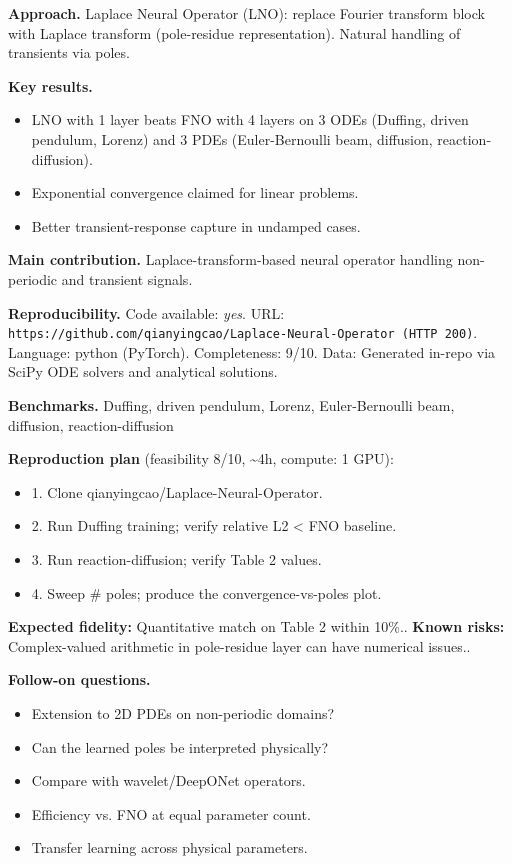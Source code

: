 \documentclass[10pt,letterpaper]{article}
\begin{document}
\textbf{Approach.} Laplace Neural Operator (LNO): replace Fourier transform block with Laplace transform (pole-residue representation). Natural handling of transients via poles.

\textbf{Key results.}
\begin{itemize}
\item LNO with 1 layer beats FNO with 4 layers on 3 ODEs (Duffing, driven pendulum, Lorenz) and 3 PDEs (Euler-Bernoulli beam, diffusion, reaction-diffusion).
\item Exponential convergence claimed for linear problems.
\item Better transient-response capture in undamped cases.
\end{itemize}

\textbf{Main contribution.} Laplace-transform-based neural operator handling non-periodic and transient signals.

\textbf{Reproducibility.} Code available: \emph{yes}. URL: \texttt{https://github.com/qianyingcao/Laplace-Neural-Operator (HTTP 200)}. Language: python (PyTorch). Completeness: 9/10. Data: Generated in-repo via SciPy ODE solvers and analytical solutions.

\textbf{Benchmarks.} Duffing, driven pendulum, Lorenz, Euler-Bernoulli beam, diffusion, reaction-diffusion

\textbf{Reproduction plan} (feasibility 8/10, \textasciitilde4h, compute: 1 GPU):
\begin{itemize}
\item 1. Clone qianyingcao/Laplace-Neural-Operator.
\item 2. Run Duffing training; verify relative L2 < FNO baseline.
\item 3. Run reaction-diffusion; verify Table 2 values.
\item 4. Sweep \# poles; produce the convergence-vs-poles plot.
\end{itemize}
\textbf{Expected fidelity:} Quantitative match on Table 2 within 10\%.. \textbf{Known risks:} Complex-valued arithmetic in pole-residue layer can have numerical issues..

\textbf{Follow-on questions.}
\begin{itemize}
\item Extension to 2D PDEs on non-periodic domains?
\item Can the learned poles be interpreted physically?
\item Compare with wavelet/DeepONet operators.
\item Efficiency vs. FNO at equal parameter count.
\item Transfer learning across physical parameters.
\end{itemize}
\end{document}
